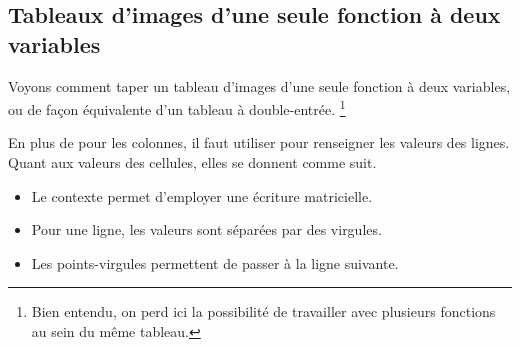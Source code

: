 \documentclass{tutodoc}
\begin{document}

\subsection{Tableaux d'images d'une seule fonction à deux variables}

Voyons comment taper un tableau d'images d'une seule fonction à deux variables, ou de façon équivalente d'un tableau à double-entrée.
\footnote{
	Bien entendu, on perd ici la possibilité de travailler avec plusieurs fonctions au sein du même tableau.
}




\begin{tdocexa}
    En plus de  pour les colonnes, il faut utiliser  pour renseigner les valeurs des lignes.
    Quant aux valeurs des cellules, elles se donnent comme suit.
    \begin{itemize}
    	\item Le contexte  permet d'employer une écriture matricielle.

    	\item Pour une ligne, les valeurs sont séparées par des virgules.

    	\item Les points-virgules permettent de passer à la ligne suivante.
    \end{itemize}

\end{tdocexa}




\begin{tdocexa}
    \leavevmode

\end{tdocexa}
\end{document}
